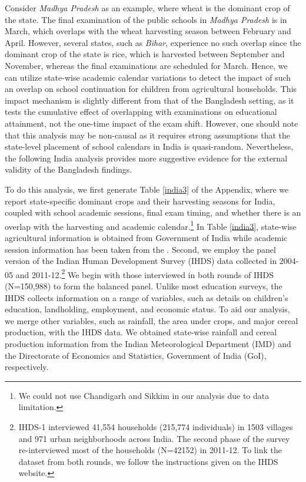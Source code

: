 \documentclass[12pt,letterpaper]{article}
\newcommand{\0}{\ensuremath{\mbox{\boldmath $0$}}}
\begin{document}
Consider \textit{Madhya Pradesh} as an example, where wheat is the dominant crop of the state. The final examination of the public schools in \textit{Madhya Pradesh} is in March, which overlaps with the wheat harvesting season between February and April. However, several states, such as \textit{Bihar}, experience no such overlap since the dominant crop of the state is rice, which is harvested between September and November, whereas the final examinations are scheduled for March. Hence, we can utilize state-wise academic calendar variations to detect the impact of such an overlap on school continuation for children from agricultural households. This impact mechanism is slightly different from that of the Bangladesh setting, as it tests the cumulative effect of overlapping with examinations on educational attainment, not the one-time impact of the exam shift. However, one should note that this analysis may be non-causal as it requires strong assumptions that the state-level placement of school calendars in India is quasi-random. Nevertheless, the following India analysis provides more suggestive evidence for the external validity of the Bangladesh findings. 

To do this analysis, we first generate Table \ref{india3} of the Appendix, where we report state-specific dominant crops and their harvesting seasons for India, coupled with school academic sessions, final exam timing, and whether there is an overlap with the harvesting and academic calendar.\footnote{We could not use Chandigarh and Sikkim in our analysis due to data limitation.} In Table \ref{india3}, state-wise agricultural information is obtained from Government of India \citep{doac2017agricultural} while academic session information has been taken from the \cite{doac2011education}. Second, we employ the panel version of the Indian Human Development Survey (IHDS) data collected in 2004-05 and 2011-12.\footnote{IHDS-1 interviewed 41,554 households (215,774 individuals) in 1503 villages and 971 urban neighborhoods across India. The second phase of the survey re-interviewed most of the households (N=42152) in 2011-12. To link the dataset from both rounds, we follow the instructions given on the IHDS website.} We begin with those interviewed in both rounds of IHDS (N=150,988) to form the balanced panel. Unlike most education surveys, the IHDS collects information on a range of variables, such as details on children's education, landholding, employment, and economic status. To aid our analysis, we merge other variables, such as rainfall, the area under crops, and major cereal production, with the IHDS data. We obtained state-wise rainfall and cereal production information from the Indian Meteorological Department (IMD) and the Directorate of Economics and Statistics, Government of India (GoI), respectively.
\end{document}
